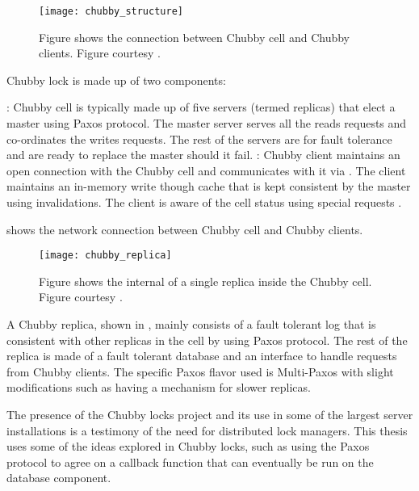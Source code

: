 \begin{figure}
  \texttt{[image: chubby\_structure]}
  \caption[Chubby structure]{%
    Figure shows the connection between Chubby cell and Chubby clients.
    Figure courtesy \citet{Burrows06}.}
  \label{figure:chubby.structure}
\end{figure}

Chubby lock is made up of two components:

\begin{itemize}
    : Chubby cell is typically made up of five servers
    (termed replicas) that elect a master using Paxos protocol. The master
    server serves all the reads requests and co-ordinates the writes requests.
    The rest of the servers are for fault tolerance and are ready to replace the
    master should it fail.
    : Chubby client maintains an open connection with
    the Chubby cell and communicates with it via %
    . The client maintains an in-memory write though cache that
    is kept consistent by the master using invalidations. The client is
    aware of the cell status using special requests%
    .
\end{itemize}

 shows the network connection between Chubby cell
 and Chubby clients.

\begin{figure}
  \texttt{[image: chubby\_replica]}
  \caption[Chubby Replica]{%
    Figure shows the internal of a single replica inside the Chubby cell.
    Figure courtesy \citet{ChandraGR07}.}
  \label{figure:chubby.replica}
\end{figure}

A Chubby replica, shown in , mainly consists of a
fault tolerant log that is consistent
with other replicas in the cell by using Paxos protocol. The rest of the
replica is made of a fault tolerant database and an interface to handle
requests from Chubby clients. The specific Paxos flavor used is Multi-Paxos
with slight modifications such as having a  mechanism for
slower replicas.

The presence of the Chubby locks project and its use in some of the largest
server installations is a testimony of the need for distributed lock
managers. This thesis uses some of the ideas explored in Chubby locks, such
as using the Paxos protocol to agree on a callback function that can
eventually be run on the database component.

